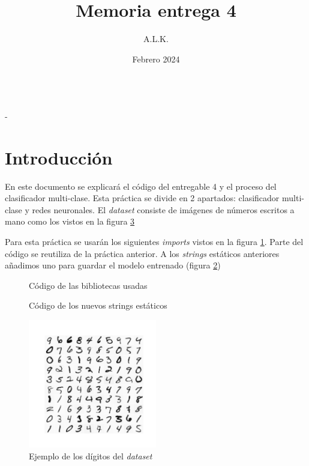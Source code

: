 \documentclass[6pt]{../../shared/AiTex}
\title{Memoria entrega 4}
\author{A.L.K.}
\date{Febrero 2024}
\begin{document}
\justify

\begin{center}

    {\huge \textbf{\underline{\subtitulo}}} \\
    { \lesson - \autor}

\end{center}


\section*{Introducción}

En este documento se explicará el código del entregable 4 y el proceso del clasificador multi-clase. Esta práctica se divide en 2 apartados: clasificador multi-clase y redes neuronales. El \textit{dataset} consiste de imágenes de números escritos a mano como los vistos en la figura \ref{fig:digitos}

Para esta práctica se usarán los siguientes \textit{imports} vistos en la figura \ref{fig:imports}. Parte del código se reutiliza de la práctica anterior. A los \textit{strings} estáticos anteriores añadimos uno para guardar el modelo entrenado (figura \ref{fig:strings})
\begin{figure}[H]
    \centering
    
    \caption{Código de las bibliotecas usadas}
    \label{fig:imports}
\end{figure}

\begin{figure}[H]
    \centering
    
    \caption{Código de los nuevos strings estáticos}
    \label{fig:strings}
\end{figure}

\begin{figure}[H]
    \centering
    \includegraphics[width=0.5\textwidth]{./imagenes/data.png}
    \caption{Ejemplo de los dígitos del \textit{dataset}}
    \label{fig:digitos}
\end{figure}
\end{document}
